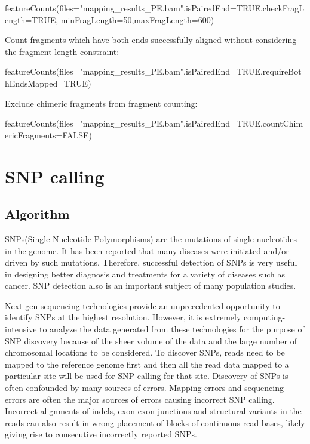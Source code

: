 \documentclass[12pt]{report}
\begin{document}
\begin{Rcode}
featureCounts(files="mapping_results_PE.bam",isPairedEnd=TRUE,checkFragLength=TRUE,
minFragLength=50,maxFragLength=600)
\end{Rcode}

\noindent Count fragments which have both ends successfully aligned without considering the fragment length constraint:

\begin{Rcode}
featureCounts(files="mapping_results_PE.bam",isPairedEnd=TRUE,requireBothEndsMapped=TRUE)
\end{Rcode}

\noindent Exclude chimeric fragments from fragment counting:

\begin{Rcode}
featureCounts(files="mapping_results_PE.bam",isPairedEnd=TRUE,countChimericFragments=FALSE)
\end{Rcode}

\chapter{SNP calling}

\section{Algorithm}

SNPs(Single Nucleotide Polymorphisms) are the mutations of single nucleotides in the genome.
It has been reported that many diseases were initiated and/or driven by such mutations.
Therefore, successful detection of SNPs is very useful in designing better diagnosis and treatments for a variety of diseases such as cancer.
SNP detection also is an important subject of many population studies.

Next-gen sequencing technologies provide an unprecedented opportunity to identify SNPs at the highest resolution.
However, it is extremely computing-intensive to analyze the data generated from these technologies for the purpose of SNP discovery  because of the sheer volume of the data and the large number of chromosomal locations to be considered.
To discover SNPs, reads need to be mapped to the reference genome first and then all the read data mapped to a particular site will be used for SNP calling for that site.
Discovery of SNPs is often confounded by many sources of errors.
Mapping errors and sequencing errors are often the major sources of errors causing incorrect SNP calling.
Incorrect alignments of indels, exon-exon junctions and structural variants in the reads can also result in wrong placement of blocks of continuous read bases, likely giving rise to consecutive incorrectly reported SNPs.
\end{document}
